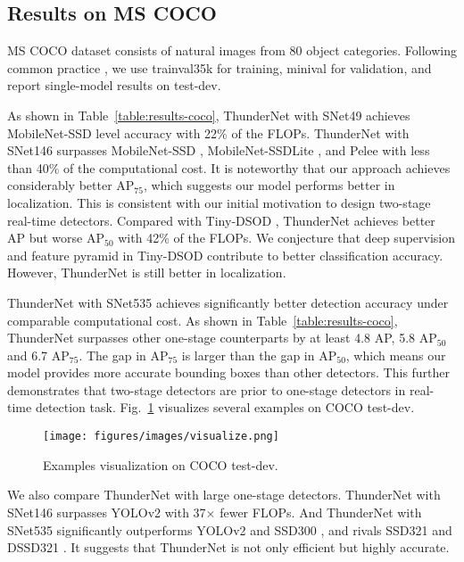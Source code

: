 \subsection{Results on MS COCO}

MS COCO dataset consists of natural images from 80 object categories.
Following common practice \cite{lin2017feature,li2017light}, we use trainval35k for training, minival for validation, and report single-model results on test-dev.

As shown in Table~\ref{table:results-coco}, ThunderNet with SNet49 achieves MobileNet-SSD level accuracy with 22\% of the FLOPs.
ThunderNet with SNet146 surpasses MobileNet-SSD \cite{howard2017mobilenets}, MobileNet-SSDLite \cite{sandler2018mobilenetv2}, and Pelee \cite{wang2018pelee} with less than 40\% of the computational cost.
It is noteworthy that our approach achieves considerably better AP$_{75}$, which suggests our model performs better in localization.
This is consistent with our initial motivation to design two-stage real-time detectors.
Compared with Tiny-DSOD \cite{li2018tiny}, ThunderNet achieves better AP but worse AP$_{50}$ with 42\% of the FLOPs.
We conjecture that deep supervision and feature pyramid in Tiny-DSOD contribute to better classification accuracy.
However, ThunderNet is still better in localization.

ThunderNet with SNet535 achieves significantly better detection accuracy under comparable computational cost.
As shown in Table~\ref{table:results-coco}, ThunderNet surpasses other one-stage counterparts by at least 4.8 AP, 5.8 AP$_{50}$ and 6.7 AP$_{75}$.
The gap in AP$_{75}$ is larger than the gap in AP$_{50}$, which means our model provides more accurate bounding boxes than other detectors.
This further demonstrates that two-stage detectors are prior to one-stage detectors in real-time detection task.
Fig.~\ref{figure:coco-visualization} visualizes several examples on COCO test-dev.



\begin{figure}[!t]
\centering
\texttt{[image: figures/images/visualize.png]}
\caption{Examples visualization on COCO test-dev.}
\label{figure:coco-visualization}
\end{figure} 
We also compare ThunderNet with large one-stage detectors.
ThunderNet with SNet146 surpasses YOLOv2 \cite{redmon2017yolo9000} with 37$\times$ fewer FLOPs.
And ThunderNet with SNet535 significantly outperforms YOLOv2 and SSD300 \cite{liu2016ssd}, and rivals SSD321 \cite{fu2017dssd} and DSSD321 \cite{fu2017dssd}.
It suggests that ThunderNet is not only efficient but highly accurate.

